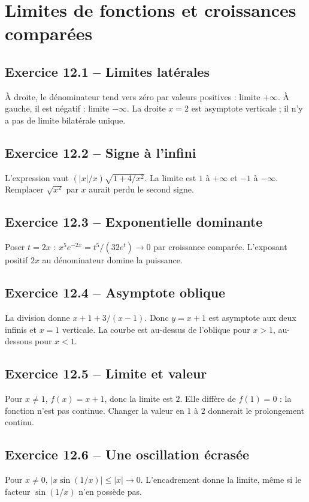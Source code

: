 \chapter{Limites de fonctions et croissances comparées}
\section*{Exercice 12.1 -- Limites latérales}
À droite, le dénominateur tend vers zéro par valeurs positives : limite $+\infty$. À gauche, il est négatif : limite $-\infty$. La droite $x=2$ est asymptote verticale ; il n'y a pas de limite bilatérale unique.

\section*{Exercice 12.2 -- Signe à l’infini}
L'expression vaut $(|x|/x)\sqrt{1+4/x^2}$. La limite est $1$ à $+\infty$ et $-1$ à $-\infty$. Remplacer $\sqrt{x^2}$ par $x$ aurait perdu le second signe.

\section*{Exercice 12.3 -- Exponentielle dominante}
Poser $t=2x$ : $x^5e^{-2x}=t^5/(32e^t)\to0$ par croissance comparée. L'exposant positif $2x$ au dénominateur domine la puissance.

\section*{Exercice 12.4 -- Asymptote oblique}
La division donne $x+1+3/(x-1)$. Donc $y=x+1$ est asymptote aux deux infinis et $x=1$ verticale. La courbe est au-dessus de l'oblique pour $x>1$, au-dessous pour $x<1$.

\section*{Exercice 12.5 -- Limite et valeur}
Pour $x\ne1$, $f(x)=x+1$, donc la limite est $2$. Elle diffère de $f(1)=0$ : la fonction n'est pas continue. Changer la valeur en $1$ à $2$ donnerait le prolongement continu.

\section*{Exercice 12.6 -- Une oscillation écrasée}
Pour $x\ne0$, $|x\sin(1/x)|\le|x|\to0$. L'encadrement donne la limite, même si le facteur $\sin(1/x)$ n'en possède pas.
